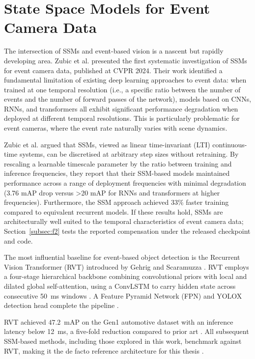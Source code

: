 \documentclass[11pt, a4paper]{report}
\begin{document}
\section{State Space Models for Event Camera Data}
The intersection of SSMs and event-based vision is a nascent but rapidly developing area. Zubic et al. \cite{zubic2024state} presented the first systematic investigation of SSMs for event camera data, published at CVPR 2024. Their work identified a fundamental limitation of existing deep learning approaches to event data: when trained at one temporal resolution (i.e., a specific ratio between the number of events and the number of forward passes of the network), models based on CNNs, RNNs, and transformers all exhibit significant performance degradation when deployed at different temporal resolutions. This is particularly problematic for event cameras, where the event rate naturally varies with scene dynamics. 

Zubic et al. \cite{zubic2024state} argued that SSMs, viewed as linear time-invariant (LTI) continuous-time systems, can be discretised at arbitrary step sizes without retraining. By rescaling a learnable timescale parameter by the ratio between training and inference frequencies, they report that their SSM-based models maintained performance across a range of deployment frequencies with minimal degradation (3.76 mAP drop versus >20 mAP for RNNs and transformers at higher frequencies). Furthermore, the SSM approach achieved 33\% faster training compared to equivalent recurrent models. If these results hold, SSMs are architecturally well suited to the temporal characteristics of event camera data; Section~\ref{subsec:f2} tests the reported compensation under the released checkpoint and code. 

The most influential baseline for event-based object detection is the Recurrent Vision Transformer (RVT) introduced by Gehrig and Scaramuzza \cite{gehrig2023recurrent}. RVT employs a four-stage hierarchical backbone combining convolutional priors with local and dilated global self-attention, using a ConvLSTM to carry hidden state across consecutive 50~ms windows \cite{gehrig2023recurrent}. A Feature Pyramid Network (FPN) and YOLOX detection head complete the pipeline \cite{gehrig2023recurrent}. 

RVT achieved $47.2$~mAP on the Gen1 automotive dataset with an inference latency below 12~ms, a five-fold reduction compared to prior art \cite{gehrig2023recurrent}. All subsequent SSM-based methods, including those explored in this work, benchmark against RVT, making it the de facto reference architecture for this thesis \cite{gehrig2023recurrent, zubic2024state, yang2025smamba}.
\end{document}
